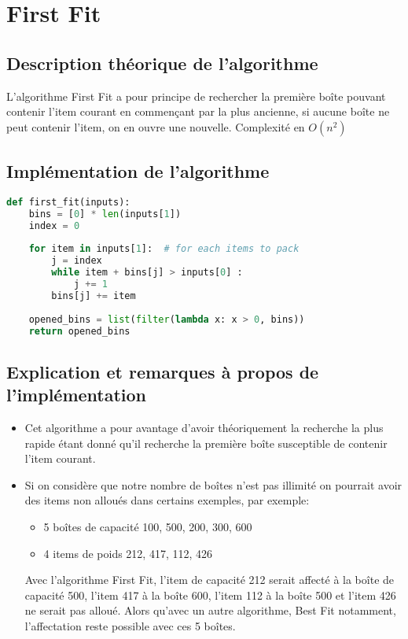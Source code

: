 \documentclass{article}
\begin{document}
\section{First Fit}
\subsection{Description théorique de l'algorithme}
L'algorithme First Fit a pour principe de rechercher la première boîte pouvant contenir l'item courant en commençant par la plus ancienne, si aucune boîte ne peut contenir l'item, on en ouvre une nouvelle.
Complexité en $O(n^2)$

\subsection{Implémentation de l'algorithme}
\begin{lstlisting}[language=Python, frame=single]
def first_fit(inputs):
    bins = [0] * len(inputs[1])
    index = 0
    
    for item in inputs[1]:  # for each items to pack
        j = index
        while item + bins[j] > inputs[0] :
            j += 1
        bins[j] += item
       
    opened_bins = list(filter(lambda x: x > 0, bins))
    return opened_bins
\end{lstlisting}

\subsection{Explication et remarques à propos de l'implémentation}
\begin{itemize}
  \item Cet algorithme a pour avantage d'avoir théoriquement la recherche la plus rapide étant donné qu'il recherche la première boîte susceptible de contenir l'item courant.
  \item Si on considère que notre nombre de boîtes n'est pas illimité on pourrait avoir des items non alloués dans certains exemples, par exemple:
  \begin{itemize}
  \item 5 boîtes de capacité 100, 500, 200, 300, 600
  \item 4 items de poids 212, 417, 112, 426
  \end{itemize}
  Avec l'algorithme First Fit, l'item de capacité 212 serait affecté à la boîte de capacité 500, l'item 417 à la boîte 600, l'item 112 à la boîte 500 et l'item 426 ne serait pas alloué. Alors qu'avec un autre algorithme, Best Fit notamment, l'affectation reste possible avec ces 5 boîtes.
\end{itemize}
\end{document}
